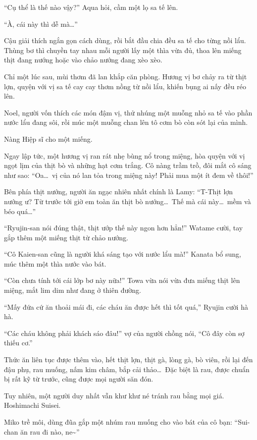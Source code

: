 \documentclass[../main.tex]{subfiles}
\begin{document}
``Cụ thể là thế nào vậy?'' Aqua hỏi, cầm một lọ sa tế lên.

``À, cái này thì dễ mà\dots''

Cậu giải thích ngắn gọn cách dùng, rồi bắt đầu chia đều sa tế cho từng nồi lẩu. Thùng bơ thì chuyền tay nhau mỗi người lấy một thìa vừa đủ, thoa lên miếng thịt đang nướng hoặc vào chảo nướng đang xèo xèo.

Chỉ một lúc sau, mùi thơm đã lan khắp căn phòng. Hương vị bơ chảy ra từ thịt lợn, quyện với vị sa tế cay cay thơm nồng từ nồi lẩu, khiến bụng ai nấy đều réo lên.

Noel, người vốn thích các món đậm vị, thử nhúng một muỗng nhỏ sa tế vào phần nước lẩu đang sôi, rồi múc một muỗng chan lên tô cơm bò còn sót lại của mình.

Nàng Hiệp sĩ cho một miếng.

Ngay lập tức, một hương vị ran rát nhẹ bùng nổ trong miệng, hòa quyện với vị ngọt lịm của thịt bò và những hạt cơm trắng. Cô nàng trầm trồ, đôi mắt cô sáng như sao: ``Oa\dots\ vị của nó lan tỏa trong miệng này! Phải mua một ít đem về thôi!''

Bên phía thịt nướng, người ăn ngạc nhiên nhất chính là Lamy: ``T-Thịt lợn nướng ư? Từ trước tới giờ em toàn ăn thịt bò nướng\dots\ Thế mà cái này\dots\ mềm và béo quá\dots''

``Ryujin-san nói đúng thật, thịt ướp thế này ngon hơn hẳn!'' Watame cười, tay gắp thêm một miếng thịt từ chảo nướng.

``Cô Kaien-san cũng là người khá sáng tạo với nước lẩu mà!'' Kanata bổ sung, múc thêm một thìa nước vào bát.

``Còn chưa tính tới cái lớp bơ này nữa!'' Towa vừa nói vừa đưa miếng thịt lên miệng, mắt lim dim như đang ở thiên đường.

``Mấy đứa cứ ăn thoải mái đi, các cháu ăn được hết thì tốt quá,'' Ryujin cười hà hà.

``Các cháu không phải khách sáo đâu!'' vợ của người chồng nói, ``Cô đây còn sợ thiếu cơ.''

Thức ăn liên tục được thêm vào, hết thịt lợn, thịt gà, lòng gà, bò viên, rồi lại đến đậu phụ, rau muống, nấm kim châm, bắp cải thảo\dots\ Đặc biệt là rau, được chuẩn bị rất kỹ từ trước, cũng được mọi người săn đón.

Tuy nhiên, một người duy nhất vẫn khư khư né tránh rau bằng mọi giá. Hoshimachi Suisei.

Miko trề môi, dùng đũa gắp một nhúm rau muống cho vào bát của cô bạn: ``Sui-chan ăn rau đi nào, ne\~{}''
\end{document}
